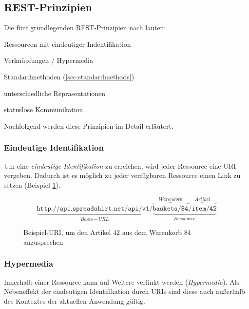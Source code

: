 \subsection{REST-Prinzipien}

Die fünf grundlegenden \gls{REST}-Prinzipien nach \cite[11 ff.]{Tilkov09} lauten:
\begin{compactitem}
    \item Ressourcen mit eindeutiger Indentifikation
    \item Verknüpfungen / Hypermedia
    \item Standardmethoden (\cref{sec:standardmethods})
    \item unterschiedliche Repräsentationen
    \item statuslose Kommunikation
\end{compactitem}

Nachfolgend werden diese Prinzipien im Detail erläutert.

\subsubsection{Eindeutige Identifikation}
\label{sec:unambigiousidentification}

Um eine \emph{eindeutige Identifikation} zu erreichen, wird jeder Ressource eine \gls{URI} vergeben. Dadurch ist es möglich zu jeder verfügbaren Ressource einen Link zu setzen (Beispiel \cref{fig:RESTexampleURI}).

\begin{figure}
    \centering
    \[
        \underbrace{\texttt{http://api.spreadshirt.net/api/v1/}}_{Basis-URL}\underbrace{\overbrace{\texttt{baskets/84}}^{Warenkorb}\overbrace{\texttt{/item/42}}^{Artikel}}_{Ressource}
    \]
    \caption{Beispiel-\gls{URI}, um den Artikel 42 aus dem Warenkorb 84 anzusprechen}
    \label{fig:RESTexampleURI}
\end{figure}

\subsubsection{Hypermedia}
\label{sec:hypermedia}

Innerhalb einer Ressource kann auf Weitere verlinkt werden (\emph{Hypermedia}). Als Nebeneffekt der eindeutigen Identifikation durch \glspl{URI} sind diese auch außerhalb des Kontextes der aktuellen Anwendung gültig. 


